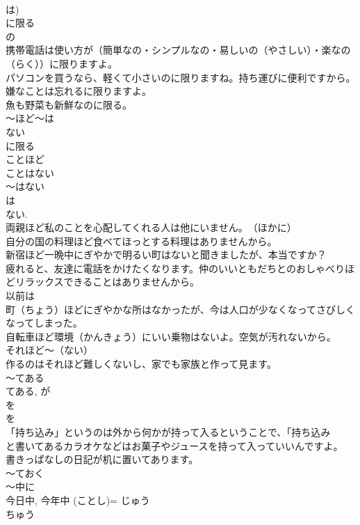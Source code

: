 \documentclass[8pt]{extreport}
\begin{document}
\begin{CJK}{UTF8}{min}
\\	は)
\\	に限る
\\	の 
\\	携帯電話は使い方が（簡単なの・シンプルなの・易しいの（やさしい）・楽なの（らく））に限りますよ。
\\	パソコンを買うなら、軽くて小さいのに限りますね。持ち運びに便利ですから。
\\	嫌なことは忘れるに限りますよ。
\\	魚も野菜も新鮮なのに限る。
\\	～ほど～は
\\	ない
\\	に限る
\\	ことほど
\\	ことはない
\\	～はない 
\\	は 
\\	ない. 
\\	両親ほど私のことを心配してくれる人は他にいません。　（ほかに）
\\	自分の国の料理ほど食べてほっとする料理はありませんから。
\\	新宿ほど一晩中にぎやかで明るい町はないと聞きましたが、本当ですか？
\\	疲れると、友達に電話をかけたくなります。仲のいいともだちとのおしゃべりほどリラックスできることはありませんから。
\\	以前は
\\	町（ちょう）ほどにぎやかな所はなかったが、今は人口が少なくなってさびしくなってしまった。
\\	自転車ほど環境（かんきょう）にいい乗物はないよ。空気が汚れないから。
\\	それほど～（ない）
\\	作るのはそれほど難しくないし、家でも家族と作って見ます。
\\	～てある
\\	てある, が 
\\	を 
\\	を 
\\	「持ち込み」というのは外から何かが持って入るということで、「持ち込み
\\	と書いてあるカラオケなどはお菓子やジュースを持って入っていいんですよ。
\\	書きっぱなしの日記が机に置いてあります。
\\	～ておく
\\	～中に
\\	今日中, 今年中 (ことし)= じゅう 
\\	ちゅう

\end{CJK}
\end{document}

